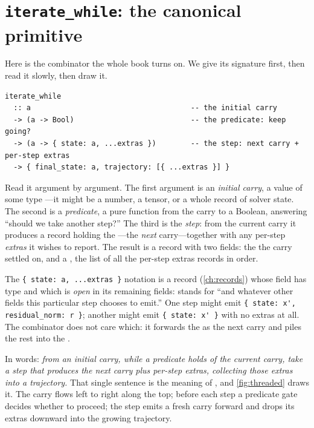 \section{\texorpdfstring{\texttt{iterate\_while}}{iterate\_while}: the canonical primitive}
\label{sec:iteratewhile}

Here is the combinator the whole book turns on. We give its signature first, then
read it slowly, then draw it.

\begin{lstlisting}[style=l4style]
iterate_while
  :: a                                     -- the initial carry
  -> (a -> Bool)                           -- the predicate: keep going?
  -> (a -> { state: a, ...extras })        -- the step: next carry + per-step extras
  -> { final_state: a, trajectory: [{ ...extras }] }
\end{lstlisting}

Read it argument by argument. The first argument is an \emph{initial carry}, a
value of some type ---it might be a number, a tensor, or a whole record
of solver state. The second is a \emph{predicate}, a pure function from the carry
to a Boolean, answering ``should we take another step?'' The third is the
\emph{step}: from the current carry it produces a record holding the
---the \emph{next} carry---together with any per-step
\emph{extras} it wishes to report. The result is a record with two fields: the
 the carry settled on, and a , the list of
all the per-step extras records in order.

\begin{notationbox}
The \lstinline[style=l4style]|{ state: a, ...extras }| notation is a record
(\cref{ch:records}) whose  field has type  and which is
\emph{open} in its remaining fields:  stands for ``and whatever
other fields this particular step chooses to emit.'' One step might emit
\lstinline[style=l4style]|{ state: x', residual_norm: r }|; another might emit
\lstinline[style=l4style]|{ state: x' }| with no extras at all. The combinator
does not care which: it forwards the  as the next carry and piles the
rest into the .
\end{notationbox}

In words: \emph{from an initial carry, while a predicate holds of the current
carry, take a step that produces the next carry plus per-step extras, collecting
those extras into a trajectory.} That single sentence is the meaning of
, and \cref{fig:threaded} draws it. The carry flows left to
right along the top; before each step a predicate gate decides whether to
proceed; the step emits a fresh carry forward and drops its extras downward into
the growing trajectory.

